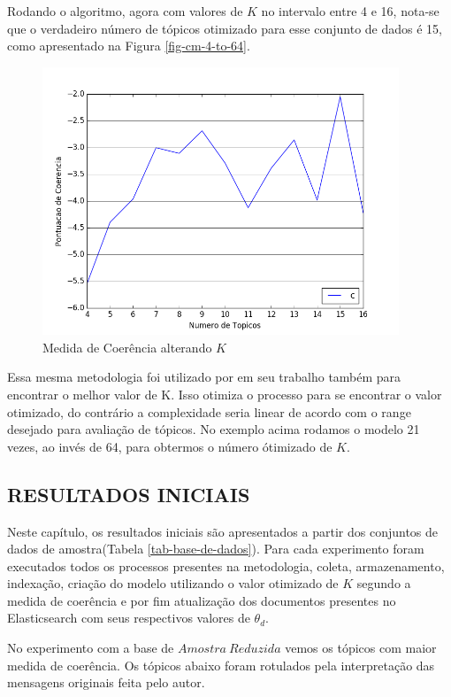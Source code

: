 \documentclass[12pt,a4paper]{article}
\begin{document}
Rodando o algoritmo, agora com valores de $K$ no intervalo entre 4 e 16, nota-se que o verdadeiro número de tópicos otimizado para esse 
 conjunto de dados é 15, como apresentado na Figura \ref{fig-cm-4-to-64}.

\begin{figure}[H]
	\centering
    \includegraphics[height=8cm]{images/figure_6.png}
    \caption{Medida de Coerência alterando $K$}
    \label{fig-cm-4-to-16}
\end{figure}

Essa mesma metodologia foi utilizado por  em seu trabalho também para encontrar o melhor valor de K. Isso otimiza
 o processo para se encontrar o valor otimizado, do contrário a complexidade seria linear de acordo com o range desejado para avaliação de
 tópicos. No exemplo acima rodamos o modelo 21 vezes, ao invés de 64, para obtermos o número ótimizado de $K$.

\subsection{RESULTADOS INICIAIS}

Neste capítulo, os resultados iniciais são apresentados a partir dos conjuntos de dados de amostra(Tabela \ref{tab-base-de-dados}).
 Para cada experimento foram executados todos os processos presentes na metodologia, coleta, armazenamento, indexação, criação do modelo utilizando o valor
 otimizado de $K$ segundo a medida de coerência e por fim atualização dos documentos presentes no Elasticsearch com seus respectivos valores de $\theta_d$.


No experimento com a base de $Amostra\ Reduzida$ vemos os tópicos com maior medida de coerência.
 Os tópicos abaixo foram rotulados pela interpretação das mensagens originais feita pelo autor.
\end{document}
